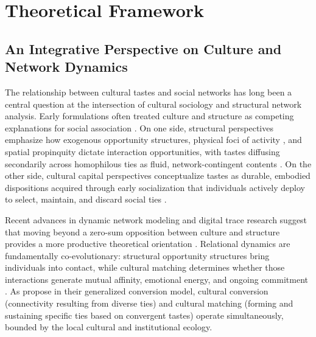 \documentclass[12pt,letterpaper]{article}
\begin{document}
\section{Theoretical Framework}\label{theoretical-framework}

\subsection{An Integrative Perspective on Culture and Network Dynamics}\label{tastes-and-social-networks}

The relationship between cultural tastes and social networks has long been a central question at the intersection of cultural sociology and structural network analysis. Early formulations often treated culture and structure as competing explanations for social association \citep{erickson1996, mark1998a, mark2003, lizardo2006}. On one side, structural perspectives emphasize how exogenous opportunity structures, physical foci of activity \citep{feld1981}, and spatial propinquity dictate interaction opportunities, with tastes diffusing secondarily across homophilous ties as fluid, network-contingent contents \citep{carley1991, borgatti2005}. On the other side, cultural capital perspectives conceptualize tastes as durable, embodied dispositions acquired through early socialization that individuals actively deploy to select, maintain, and discard social ties \citep{bourdieu1984, bourdieu1990, holt1998, childress2019encultured-e58}.

Recent advances in dynamic network modeling and digital trace research suggest that moving beyond a zero-sum opposition between culture and structure provides a more productive theoretical orientation \citep{lewis2018, shalizi2011, edelmann2014cultural-a77,stark2020meeting}. Relational dynamics are fundamentally co-evolutionary: structural opportunity structures bring individuals into contact, while cultural matching determines whether those interactions generate mutual affinity, emotional energy, and ongoing commitment \citep{collins2004, lizardo2006}. As \citet{lewis2018} propose in their generalized conversion model, cultural conversion (connectivity resulting from diverse ties) and cultural matching (forming and sustaining specific ties based on convergent tastes) operate simultaneously, bounded by the local cultural and institutional ecology.
\end{document}
